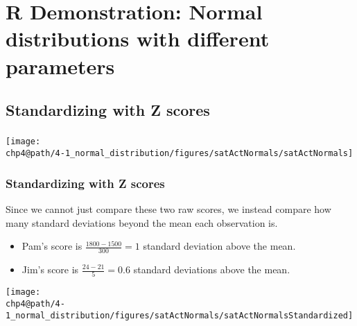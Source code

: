 \documentclass[slidestop,compress,mathserif]{beamer}
\makeatletter
\def\chp4@path{../../Chp 4}
\makeatother
\begin{document}

\section{R Demonstration: Normal distributions with different parameters}


\subsection{Standardizing with Z scores}


\begin{frame}
\frametitle{}


\begin{center}
\texttt{[image: \\chp4@path/4-1\_normal\_distribution/figures/satActNormals/satActNormals]}
\end{center}

\end{frame}


\begin{frame}
\frametitle{Standardizing with Z scores}

Since we cannot just compare these two raw scores, we instead compare how many standard deviations beyond the mean each observation is.

\begin{itemize}

\item Pam's score is $\frac{1800 - 1500}{300} = 1$ standard deviation above the mean.

\item Jim's score is $\frac{24 - 21}{5} = 0.6$ standard deviations above the mean.

\end{itemize}

\begin{center}
\texttt{[image: \\chp4@path/4-1\_normal\_distribution/figures/satActNormals/satActNormalsStandardized]}
\end{center}

\end{frame}
\end{document}

